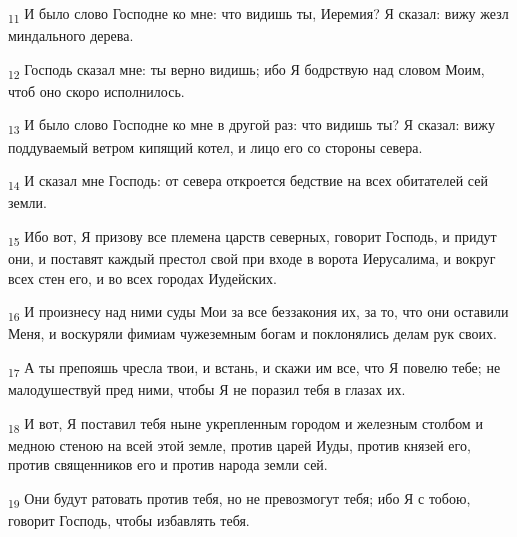 \begin{tcolorbox}
\textsubscript{11} И было слово Господне ко мне: что видишь ты, Иеремия? Я сказал: вижу жезл миндального дерева.
\end{tcolorbox}
\begin{tcolorbox}
\textsubscript{12} Господь сказал мне: ты верно видишь; ибо Я бодрствую над словом Моим, чтоб оно скоро исполнилось.
\end{tcolorbox}
\begin{tcolorbox}
\textsubscript{13} И было слово Господне ко мне в другой раз: что видишь ты? Я сказал: вижу поддуваемый ветром кипящий котел, и лицо его со стороны севера.
\end{tcolorbox}
\begin{tcolorbox}
\textsubscript{14} И сказал мне Господь: от севера откроется бедствие на всех обитателей сей земли.
\end{tcolorbox}
\begin{tcolorbox}
\textsubscript{15} Ибо вот, Я призову все племена царств северных, говорит Господь, и придут они, и поставят каждый престол свой при входе в ворота Иерусалима, и вокруг всех стен его, и во всех городах Иудейских.
\end{tcolorbox}
\begin{tcolorbox}
\textsubscript{16} И произнесу над ними суды Мои за все беззакония их, за то, что они оставили Меня, и воскуряли фимиам чужеземным богам и поклонялись делам рук своих.
\end{tcolorbox}
\begin{tcolorbox}
\textsubscript{17} А ты препояшь чресла твои, и встань, и скажи им все, что Я повелю тебе; не малодушествуй пред ними, чтобы Я не поразил тебя в глазах их.
\end{tcolorbox}
\begin{tcolorbox}
\textsubscript{18} И вот, Я поставил тебя ныне укрепленным городом и железным столбом и медною стеною на всей этой земле, против царей Иуды, против князей его, против священников его и против народа земли сей.
\end{tcolorbox}
\begin{tcolorbox}
\textsubscript{19} Они будут ратовать против тебя, но не превозмогут тебя; ибо Я с тобою, говорит Господь, чтобы избавлять тебя.
\end{tcolorbox}
